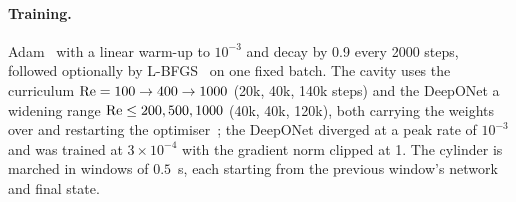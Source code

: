 \paragraph{Training.} Adam~\cite{kingma2015adam} with a linear warm-up to $10^{-3}$ and decay by 0.9 every 2000
steps, followed optionally by L-BFGS~\cite{liu1989lbfgs} on one fixed batch. The cavity uses the curriculum
$\mathrm{Re}=100\to400\to1000$ (20k, 40k, 140k steps) and the DeepONet a widening range $\mathrm{Re}\le200,500,1000$ (40k, 40k,
120k), both carrying the weights over and restarting the optimiser~\cite{krishnapriyan2021failure}; the
DeepONet diverged at a peak rate of $10^{-3}$ and was trained at $3\times10^{-4}$ with the gradient norm clipped
at 1. The cylinder is
marched in windows of $0.5$~s, each starting from the previous window's network and final state.
